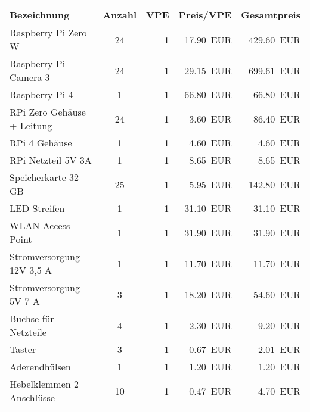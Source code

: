 \documentclass[./00PhotoBox.tex]{subfiles}
\begin{document}
\begin{table}[ht]
    \centering
    \begin{tabular}{l|c|r|r|r}
        Bezeichnung                            & Anzahl & \acrshort{VPE} & Preis/\acrshort{VPE} & Gesamtpreis       \\
        \hline
        Raspberry Pi Zero W                    & 24     & 1              & \SI{17,90}{EUR}      & \SI{429,60}{EUR}  \\
        Raspberry Pi Camera 3                  & 24     & 1              & \SI{29,15}{EUR}      & \SI{699,61}{EUR}  \\
        Raspberry Pi 4                         & 1      & 1              & \SI{66,80}{EUR}      & \SI{66,80}{EUR}   \\
        RPi Zero Gehäuse + Leitung             & 24     & 1              & \SI{3,60}{EUR}       & \SI{86,40}{EUR}   \\
        RPi 4 Gehäuse                          & 1      & 1              & \SI{4,60}{EUR}       & \SI{4,60}{EUR}    \\
        RPi  Netzteil 5V 3A                    & 1      & 1              & \SI{8,65}{EUR}       & \SI{8,65}{EUR}    \\
        Speicherkarte 32 GB                    & 25     & 1              & \SI{5,95}{EUR}       & \SI{142,80}{EUR}  \\
        LED-Streifen                           & 1      & 1              & \SI{31,10}{EUR}      & \SI{31,10}{EUR}   \\
        WLAN-Access-Point                      & 1      & 1              & \SI{31,90}{EUR}      & \SI{31,90}{EUR}   \\
        Stromversorgung 12V 3,5 A              & 1      & 1              & \SI{11,70}{EUR}      & \SI{11,70}{EUR}   \\
        Stromversorgung 5V 7 A                 & 3      & 1              & \SI{18,20}{EUR}      & \SI{54,60}{EUR}   \\
        Buchse für Netzteile                   & 4      & 1              & \SI{2,30}{EUR}       & \SI{9,20}{EUR}    \\
        Taster                                 & 3      & 1              & \SI{0,67}{EUR}       & \SI{2,01}{EUR}    \\
        Aderendhülsen                          & 1      & 1              & \SI{1,20}{EUR}       & \SI{1,20}{EUR}    \\
        Hebelklemmen 2 Anschlüsse              & 10     & 1              & \SI{0,47}{EUR}       & \SI{4,70}{EUR}    \\

\end{tabular}
\end{table}
\end{document}
